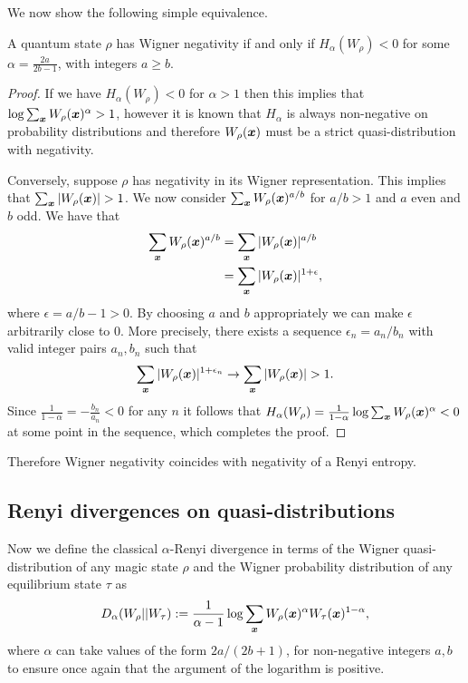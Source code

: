 \documentclass[pra,
aps,
twocolumn,
superscriptaddress,
groupedaddress,
nofootinbib,
reprint
]{revtex4-1}
\begin{document}
We now show the following simple equivalence.
\begingroup
\def\thetheorem{\ref{thm:HSchur}}
\begin{theorem}
	A quantum state $\rho$ has Wigner negativity if and only if $H_\alpha(W_\rho) < 0$ for some $\alpha =  \frac{2a}{2b-1}$, with integers $a \geq b$.
\end{theorem}
\addtocounter{theorem}{-1}
\endgroup
\begin{proof} 
If we have $H_\alpha (W_\rho) <0 $ for $\alpha >1$ then this implies that $\log \sum_{\boldsymbol{x}} W_\rho (\boldsymbol{x})^\alpha > 1$, however it is known that $H_\alpha$ is always non-negative on probability distributions and therefore $W_\rho(\boldsymbol{x})$ must be a strict quasi-distribution with negativity.

Conversely, suppose $\rho$ has negativity in its Wigner representation. This implies that $\sum_{\boldsymbol{x}} |W_\rho (\boldsymbol{x})| >1$. We now consider $\sum_{\boldsymbol{x}} W_\rho (\boldsymbol{x})^{a/b}$ for $a/b >1$ and $a$ even and $b$ odd. We have that
\begin{align}
\sum_{\boldsymbol{x}} W_\rho (\boldsymbol{x})^{a/b} &= \sum_{\boldsymbol{x}} |W_\rho (\boldsymbol{x})|^{a/b} \nonumber \\
&= \sum_{\boldsymbol{x}} |W_\rho (\boldsymbol{x})|^{1+ \epsilon},
\end{align}
where $\epsilon = a/b - 1 >0$. By choosing $a$ and $b$ appropriately we can make $\epsilon$ arbitrarily close to $0$. More precisely, there exists a sequence $\epsilon_n=a_n/b_n$ with valid integer pairs $a_n, b_n$ such that
\begin{equation}
\sum_{\boldsymbol{x}} |W_\rho (\boldsymbol{x})|^{1+ \epsilon_n} \rightarrow \sum_{\boldsymbol{x}} |W_\rho (\boldsymbol{x})| >1.
\end{equation}
Since $\frac{1}{1-\alpha}= -\frac{b_n}{a_n} <0$ for any $n$ it follows that $H_\alpha (W_\rho) = \frac{1}{1-\alpha} \log \sum_{\boldsymbol{x}} W_\rho (\boldsymbol{x})^\alpha  <0 $ at some point in the sequence, which completes the proof.
\end{proof}
Therefore Wigner negativity coincides with negativity of a Renyi entropy.

\subsection{Renyi divergences on quasi-distributions}
Now we define the classical $\alpha$-Renyi divergence in terms of the Wigner quasi-distribution of any magic state $\rho$ and the Wigner probability distribution of any equilibrium state $\tau$ as
\begin{equation}
	D_\alpha(W_\rho || W_\tau) := \frac{1}{\alpha - 1} \log \sum_{\bm{x}} W_{\rho}(\bm{x})^\alpha W_{\tau}(\bm{x})^{1-\alpha},
\end{equation}
where $\alpha$ can take values of the form $2a/(2b+1)$, for non-negative integers $a,b$ to ensure once again that the argument of the logarithm is positive.
\end{document}
